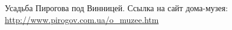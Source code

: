  
 
 
 
 


Усадьба Пирогова под Винницей. Ссылка на сайт дома-музея:
\url{http://www.pirogov.com.ua/o_muzee.htm}
